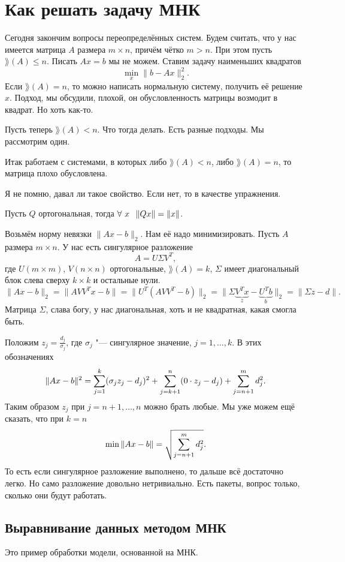 \section{Как решать задачу МНК}
Сегодня закончим вопросы переопределённых систем. Будем считать, что у нас имеется матрица $A$ размера $m\times n$, причём чётко $m>n$. При этом пусть $\rang(A)\le n$. Писать $Ax=b$ мы не можем. Ставим задачу наименьших квадратов
\[
  \min\limits_x\|b - Ax\|^2_2.
\]
Если $\rang(A)=n$, то можно написать нормальную систему, получить её решение $\hat x$. Подход, мы обсудили, плохой, он обусловленность матрицы возмодит в квадрат. Но хоть как-то.

Пусть теперь $\rang(A)<n$. Что тогда делать. Есть разные подходы. Мы рассмотрим один.

Итак работаем с системами, в которых либо $\rang(A)<n$, либо $\rang(A)=n$, то матрица плохо обусловлена.

Я не помню, давал ли такое свойство. Если нет, то в качестве упражнения.
\begin{Ut}
  Пусть $Q$ ортогональная, тогда $\forall\ x\pau \|Qx\| = \|x\|$.
\end{Ut}

Возьмём норму невязки $\|Ax-b\|_2$. Нам её надо минимизировать. Пусть $A$ размера $m\times n$. У нас есть сингулярное разложение
\[
  A = U\Sigma V^T,
\]
где $U(m\times m)$, $V(n\times n)$ ортогональные, $\rang(A)=k$, $\Sigma$ имеет диагональный блок слева сверху $k\times k$ и остальные нули.
\[
  \|Ax-b\|_2=\|A V V^T x - b\| = \big\|U^T(AVV^T - b)\big\|_2 = \|\Sigma \underbrace{V^T x}_z - \underbrace{U^Tb}_b\|_2 = \|\Sigma z - d\|.
\]
Матрица $\Sigma$, слава богу, у нас диагональная, хоть и не квадратная, какая смогла быть.

Положим $z_j = \frac{d_j}{\sigma_j}$, где $\sigma_j$ "--- сингулярное значение, $j=1,\dots,k$. В этих обозначениях
\[
  \|Ax-b\|^2 = \sum\limits_{j = 1}^{k}(\sigma_j z_j - d_j)^2 +\sum\limits_{j = k+1}^{n}(0\cdot z_j - d_j) + \sum\limits_{j = n+1}^{m}d_j^2.
\]
Таким образом $z_j$ при $j=n+1,\dots,n$ можно брать любые. Мы уже можем ещё сказать, что при $k=n$
\[
  \min\|Ax-b\| = \sqrt{\sum\limits_{j = n+1}^{m} d_j^2}.
\]
То есть если сингулярное разложение выполнено, то дальше всё достаточно легко. Но само разложение довольно нетривиально. Есть пакеты, вопрос только, сколько они будут работать.
\subsection{Выравнивание данных методом МНК}
Это пример обработки модели, основанной на МНК.


